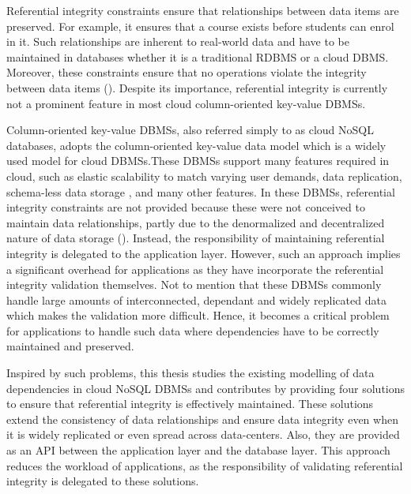    Referential integrity constraints  ensure that  relationships
   between data items are preserved. For example, it ensures that a course
   exists before students can enrol in it. Such relationships are 
   inherent to real-world data and have to be maintained in databases
   whether it is a traditional \ac{RDBMS} or a cloud \ac{DBMS}.
   Moreover, these constraints  ensure that no operations violate  the
   integrity between  data items ().   Despite its
   importance, referential integrity is currently not a prominent feature in most  cloud
   column-oriented key-value \acp{DBMS}. 
   
   
   Column-oriented key-value \acp{DBMS}, also  referred simply to as cloud
   \ac{NoSQL} databases,  adopts the column-oriented key-value data model which
   is a widely used model for cloud \acp{DBMS}.These \acp{DBMS}  support many
   features required in cloud,  such as elastic scalability to match varying
   user demands, data replication,  schema-less data storage ,   and many other
   features. In these \acp{DBMS},  referential integrity constraints are not
   provided because these were not conceived to maintain data relationships,
   partly due to the denormalized and decentralized nature of data storage
   ().
   Instead, the responsibility of maintaining referential integrity is delegated
   to the application layer.
    However, such an approach implies a significant overhead for applications as
    they have incorporate the referential integrity validation themselves. Not
    to mention that these \acp{DBMS} commonly handle large amounts of
    interconnected, dependant and widely replicated data which makes the validation more
    difficult. Hence, it becomes a  critical problem for applications to handle
   such  data where dependencies have to be correctly maintained and preserved.
   
   
	Inspired by such problems, this thesis studies the existing
modelling of data dependencies in cloud \ac{NoSQL}  \acp{DBMS}  and contributes by
providing four solutions to ensure  that referential integrity is
effectively maintained. These solutions  extend the consistency of data
relationships and  ensure  data integrity even when it is widely replicated or
even spread across data-centers. Also, they are provided as an \ac{API} between
the application layer and the database layer. This approach reduces the
workload of applications, as the responsibility
of validating referential integrity is delegated to these solutions.
%    
%      
%    
%  
   

